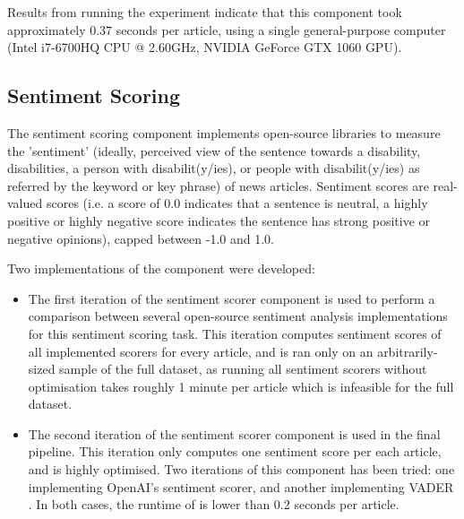 \documentclass{report}
\newcommand{\textapprox}{\raisebox{0.5ex}{\texttildelow}}  %
\begin{document}
Results from running the experiment indicate that this component took approximately 0.37 seconds per article, using a single general-purpose computer (Intel i7-6700HQ CPU @ 2.60GHz, NVIDIA GeForce GTX 1060 GPU).

\subsection{Sentiment Scoring} \label{des-sentiment}

The sentiment scoring component implements open-source libraries to measure the 'sentiment' (ideally, perceived view of the sentence towards a disability, disabilities, a person with disabilit(y/ies), or people with disabilit(y/ies) as referred by the keyword or key phrase) of news articles.
Sentiment scores are real-valued scores (i.e. a score of 0.0 indicates that a sentence is neutral, a highly positive or highly negative score indicates the sentence has strong positive or negative opinions), capped between -1.0 and 1.0.

Two implementations of the component were developed: 
\begin{itemize}
	\item The first iteration of the sentiment scorer component is used to perform a comparison between several open-source sentiment analysis implementations for this sentiment scoring task.
		This iteration computes sentiment scores of all implemented scorers for every article, and is ran only on an arbitrarily-sized sample of the full dataset, as running all sentiment scorers without optimisation takes roughly \textapprox1 minute per article which is infeasible for the full dataset.
	\item The second iteration of the sentiment scorer component is used in the final pipeline.
		This iteration only computes one sentiment score per each article, and is highly optimised.
		Two iterations of this component has been tried: one implementing OpenAI's \cite{OpenAI} sentiment scorer, and another implementing VADER \cite{VADER}.
		In both cases, the runtime of is lower than 0.2 seconds per article.
\end{itemize}
\end{document}
